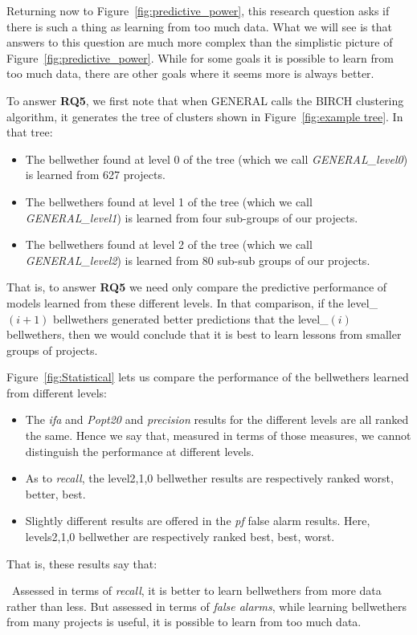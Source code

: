 \documentclass[10pt,journal,compsoc]{IEEEtran}
\newcommand{\fig}[1]{Figure~\ref{fig:#1}}
\newcommand{\bi}{\begin{itemize}}
\newcommand{\ei}{\end{itemize}}
\newenvironment{RQ}[1]%
{\noindent\begin{minipage}[c]{\linewidth}%
\begin{bclogo}[couleur=gray!20,%
                arrondi=0.1,logo=\bctrombone,%
                ombre=true%
                ]{{\small  ~#1}}}%
{\end{bclogo}\vspace{2mm}\end{minipage}}
\begin{document}
Returning now to \fig{predictive_power}, this
research question asks if there is such a thing
as learning from too much data.  What we will see is that
answers to this question are much more complex than the simplistic
picture of \fig{predictive_power}. While for some goals it is possible
to learn from too much data, there are other goals where it seems
more is always better.

To answer {\bf RQ5}, we first note that when GENERAL
calls the BIRCH clustering algorithm, it generates the tree
of clusters shown in  
\fig{example tree}. In that tree:
\bi
\item
The bellwether found at level 0 of the tree
(which we call {\em GENERAL\_level0}) is learned from 627 projects.
\item
The bellwethers found at level 1 of the tree
(which we call {\em GENERAL\_level1}) is learned from four sub-groups
of our projects.
\item
The bellwethers found at level 2 of the tree
(which we call {\em GENERAL\_level2}) is learned from 80
sub-sub groups of our projects.
\ei
That is, to answer {\bf RQ5} we need only compare the predictive performance
of models learned from these different levels. In that comparison,
if the level\_$(i+1)$ bellwethers generated better predictions
that the   level\_$(i)$ bellwethers, then we would conclude that it is best to learn lessons from smaller groups
of projects.

Figure~\ref{fig:Statistical} lets us
compare the performance of the bellwethers learned from different 
levels:
\bi
\item The {\em ifa} and {\em Popt20} 
and {\em precision}  results for the different levels
are all ranked the same.  Hence we say that, measured in terms of those 
measures, we cannot distinguish the performance at different levels.
\item 
As to {\em recall},   the level2,1,0 bellwether results are 
respectively ranked worst, better, best. 
\item
Slightly different results are offered in the {\em pf} false alarm results. Here,  levels2,1,0 bellwether are respectively ranked best, best, worst.
\ei
That is, these results say that:

\begin{RQ}
{Assessed in terms of {\em recall},
it is better to learn bellwethers from more data rather than less.
But assessed in terms of {\em false alarms}, 
while learning bellwethers
from many projects is useful, it is possible to learn from too much data.} 
\end{RQ}
\end{document}
